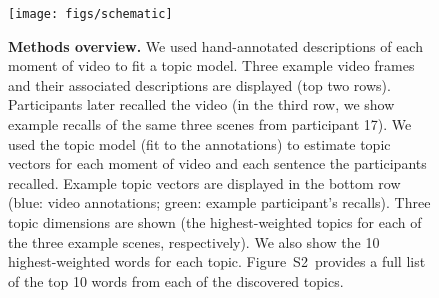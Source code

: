 \documentclass{article}
\newcommand{\topics}{S2}
\begin{document}
\begin{figure}[tp]
\centering
\texttt{[image: figs/schematic]}
\caption{\small \textbf{Methods overview.} We used hand-annotated descriptions of each moment of video to fit a topic model.  Three example video frames and their associated descriptions are displayed (top two rows).  Participants later recalled the video (in the third row, we show example recalls of the same three scenes from participant 17).  We used the topic model (fit to the annotations) to estimate topic vectors for each moment of video and each sentence the participants recalled.  Example topic vectors are displayed in the bottom row (blue: video annotations; green: example participant's recalls).  Three topic dimensions are shown (the highest-weighted topics for each of the three example scenes, respectively).  We also show the 10 highest-weighted words for each topic.  Figure~\topics~provides a full list of the top 10 words from each of the discovered topics.}
\label{fig:schematic}
\end{figure}
\end{document}
